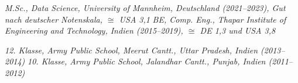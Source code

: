 
\begin{scholarship}
		{\textit{M.Sc., Data Science, University of Mannheim, Deutschland (2021--2023), Gut nach deutscher Notenskala, $\cong$ USA 3,1}}
		{\textit{BE, Comp. Eng., Thapar Institute of Engineering and Technology, Indien (2015--2019), $\cong$ DE 1,3 und USA 3,8}}

		{\textit{12. Klasse, Army Public School, Meerut Cantt., Uttar Pradesh, Indien (2013--2014)}}
		{\textit{10. Klasse, Army Public School, Jalandhar Cantt., Punjab, Indien (2011--2012)}}
\end{scholarship}

